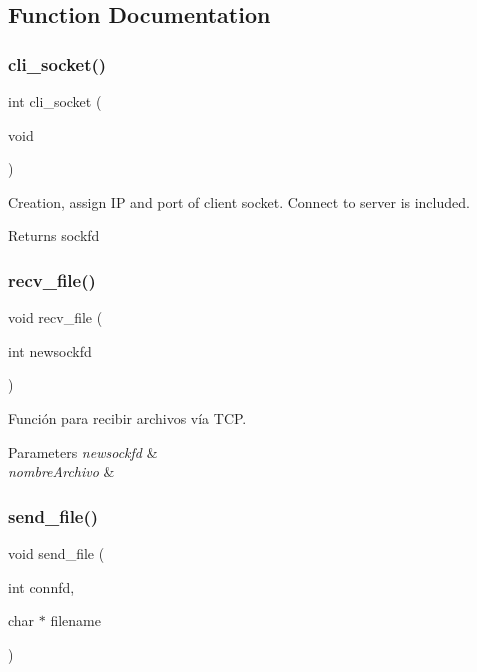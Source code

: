 \subsection{Function Documentation}
\mbox{\label{socket_8c_a9c129efbce40f3061d7899d2adf36a55}} 
\subsubsection{cli\+\_\+socket()}
{\footnotesize\ttfamily int cli\+\_\+socket (\begin{DoxyParamCaption}\item[{void}]{ }\end{DoxyParamCaption})}



Creation, assign IP and port of client socket. Connect to server is included. 

\begin{DoxyReturn}{Returns}
sockfd 
\end{DoxyReturn}
\mbox{\label{socket_8c_afe49ab8d5d6dbc407156f33dce0152cf}} 
\subsubsection{recv\+\_\+file()}
{\footnotesize\ttfamily void recv\+\_\+file (\begin{DoxyParamCaption}\item[{int}]{newsockfd }\end{DoxyParamCaption})}



Función para recibir archivos vía T\+CP. 


\begin{DoxyParams}{Parameters}
{\em newsockfd} & \\
\hline
{\em nombre\+Archivo} & \\
\hline
\end{DoxyParams}
\mbox{\label{socket_8c_a91bd21665371000f5251a149716f82fb}} 
\subsubsection{send\+\_\+file()}
{\footnotesize\ttfamily void send\+\_\+file (\begin{DoxyParamCaption}\item[{int}]{connfd,  }\item[{char $\ast$}]{filename }\end{DoxyParamCaption})}

